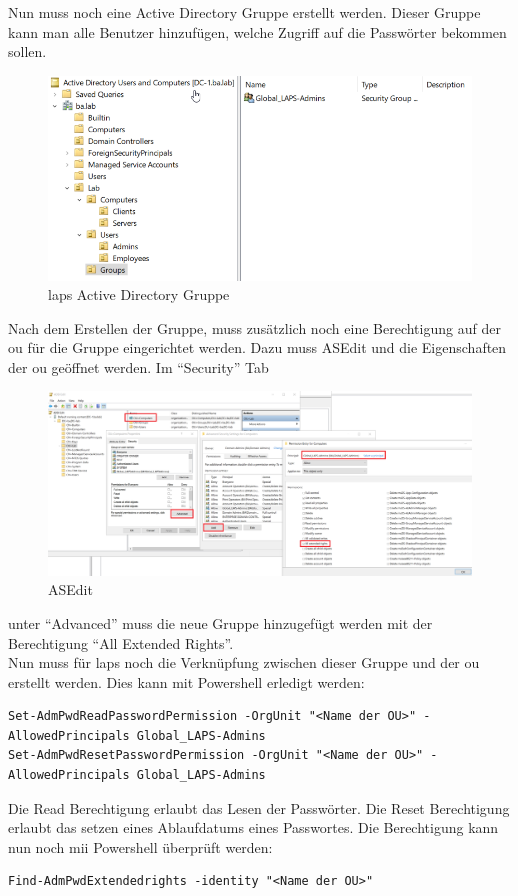 Nun muss noch eine Active Directory Gruppe erstellt werden.
Dieser Gruppe kann man alle Benutzer hinzufügen, welche Zugriff auf die Passwörter bekommen sollen.

\begin{figure}[H]
    \centering
    \includegraphics[width=\linewidth]{../img/LAPS/Laps-Admins.png}
    \caption{\acrshort{laps} Active Directory Gruppe}
\end{figure}

Nach dem Erstellen der Gruppe, muss zusätzlich noch eine Berechtigung auf der \acrshort{ou} für die Gruppe eingerichtet werden.
Dazu muss ASEdit und die Eigenschaften der \acrshort{ou} geöffnet werden. Im ``Security'' Tab
\begin{figure}[H]
    \centering
    \includegraphics[width=0.9\linewidth]{../img/LAPS/ASEdit.png}
    \caption{ASEdit}
\end{figure}
unter ``Advanced'' muss die neue Gruppe hinzugefügt werden mit der Berechtigung ``All Extended Rights''.\\

Nun muss für \acrshort{laps} noch die Verknüpfung zwischen dieser Gruppe und der \acrshort{ou} erstellt werden.
Dies kann mit Powershell erledigt werden:
\begin{lstlisting}
Set-AdmPwdReadPasswordPermission -OrgUnit "<Name der OU>" -AllowedPrincipals Global_LAPS-Admins
Set-AdmPwdResetPasswordPermission -OrgUnit "<Name der OU>" -AllowedPrincipals Global_LAPS-Admins
\end{lstlisting}
Die Read Berechtigung erlaubt das Lesen der Passwörter.
Die Reset Berechtigung erlaubt das setzen eines Ablaufdatums eines Passwortes.
Die Berechtigung kann nun noch mii Powershell überprüft werden:
\begin{lstlisting}
Find-AdmPwdExtendedrights -identity "<Name der OU>"
\end{lstlisting}


